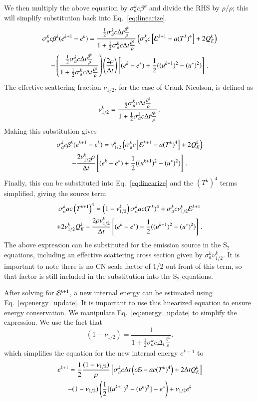 We then multiply the above equation by $\sigma_a^k c \beta^k$ and divide the RHS
by $\rho/\rho$; this will simplify substitution back into
Eq.~\eqref{eq:linearize}.
\begin{multline}
    \sigma_a^k c \beta^k (e^{k+1} - e^k) = \frac{\frac{1}{2}\sigma_a^k c \Delta t
    \frac{\beta^k}{\rho}}{1+\frac{1}{2}\sigma_a^k c \Delta t \frac{\beta^k}{\rho}}
    \left(\sigma_a^k c\left[\mathcal{E}^{k+1} - a (T^k)^4\right] + 2Q_E^k\right)\\
    - \left(\frac{\frac{1}{2}\sigma_a^k c\Delta t \frac{\beta^k}{\rho}}
    {1 +\frac{1}{2}\sigma_a^k c \Delta t \frac{\beta^k}{\rho}}\right)
    \left(\frac{2\rho}{\Delta t}\right)\left[(e^k - e^*)
    + \frac{1}{2}((u^{k+1})^2 - (u^*)^2)\right] \, .
 \end{multline}
The effective scattering fraction $\nu_{1/2}$, for the case of Crank Nicolson, is
defined as
\begin{equation}
    \nu_{1/2}^k = \frac{\frac{1}{2}\sigma_a^k c\Delta t \frac{\beta^k}{\rho}}
    {1 + \frac{1}{2}\sigma_a^k c\Delta t \frac{\beta^k}{\rho}  } \, .
\end{equation}
Making this substitution gives
\begin{multline*}
    \sigma_a^k c \beta^k(e^{k+1} - e^k) = \nu_{1/2}^k \left(\sigma_a^k c
    \left[\mathcal{E}^{k+1} - a (T^k)^4\right] + 2Q_E^k\right)\\
    -\frac{2\nu_{1/2}^k\rho}{\Delta t} \left[(e^k - e^*)
    + \frac{1}{2}((u^{k+1})^2 - (u^*)^2)\right] \, .
\end{multline*}
Finally, this can be substituted into Eq.~\eqref{eq:linearize} and the $(T^k)^4$
terms simplified, giving the source term
\begin{multline}
   \sigma_a^k a c\left(T^{k+1}\right)^4 = \left(1 - \nu_{1/2}^k\right)
   \sigma_a^k a c (T^k)^4 + \sigma_a^k c \nu_{1/2}^k \mathcal{E}^{k+1}\\
   +2\nu_{1/2}^k Q_E^k - \frac{2\rho\nu_{1/2}^k}{\Delta t}
   \left[(e^k - e^*) + \frac{1}{2}((u^{k+1})^2 - (u^*)^2)\right] \, .
\end{multline}
The above expression can be substituted for the emission source in the S$_2$
equations, including an effective scattering cross section given by $\sigma_a^k
\nu_{1/2}^k$. It is important to note there is no CN scale factor of 1/2 out front of
this term, so that factor is still included in the substitution into the S$_2$
equations.

After solving for $\mathcal{E}^{k+1}$, a new internal energy can be estimated
using Eq.~\eqref{eq:energy_update}. It is important to use this linearized
equation to ensure energy conservation.  We manipulate Eq.~\eqref{eq:energy_update}
to simplify the expression.  We use the fact
that
\begin{equation}
   (1 - \nu_{1/2}) = \frac{1}{1+\frac{1}{2}\sigma_a^kc\Delta_t\frac{\beta^k}{\rho}}.
\end{equation}
which simplifies the equation for the new internal energy $e^{k+1}$ to
\begin{multline}
    e^{k+1} = \frac{1}{2}\frac{(1-\nu_{1/2})}{\rho}\left[\sigma_a^k c\Delta t \left(c\mathcal{E}
    - ac(T^k)^4\right) + 2\Delta t Q_E^k \right] \\ - (1 -
    \nu_{1/2})\left(\frac{1}{2}[(u^{k+1})^2 - (u^{k})^2]-e^*\right) + \nu_{1/2}e^k
\end{multline}

